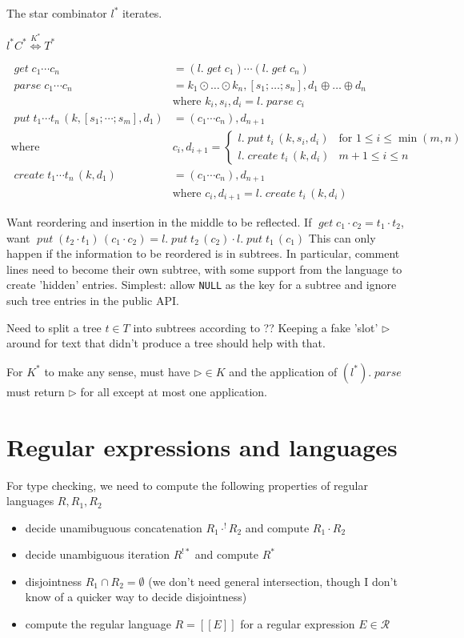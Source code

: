 \documentclass[12pt,fleqn]{amsart}
\newcommand{\ensmath}[1]{\ensuremath{#1}\xspace}
\newcommand{\opnam}[1]{\ensmath{\operatorname{\mathit{#1}}}}
\newcommand{\nparse}{\opnam{parse}}
\newcommand{\lget}[1]{\opnam{get}{#1}}
\newcommand{\lparse}[1]{\nparse{#1}}
\newcommand{\lput}[2]{\opnam{put}{#1}\,{(#2)}}
\newcommand{\lcreate}[2]{\opnam{create}{#1}\,{(#2)}}
\newcommand{\lenstype}[3][K]{\ensmath{{#2}\stackrel{#1}{\Longleftrightarrow}{#3}}}
\newcommand{\Regexp}{\ensmath{\mathcal R}}
\newcommand{\reglang}[1]{\ensmath{[\![{#1}]\!]}}
\newcommand{\conc}[2]{\ensmath{#1\cdot #2}}
\newcommand{\uaconc}[2]{\ensmath{#1\cdot^{!} #2}}
\newcommand{\cstar}[1]{\ensmath{#1^*}}
\newcommand{\uastar}[1]{\ensmath{#1^{!*}}}
\newcommand{\key}[1]{\ensmath{\kappa(#1)}}
\begin{document}
The star combinator $\cstar{l}$ iterates.

\infrule{l\in\lenstype{C}{T} \andalso \uastar{C} \andalso \uastar{\key{T}}}
        {\cstar{l}\in\lenstype[\cstar{K}]{\cstar{C}}{\cstar{T}}}

\begin{align*}
  \lget{c_1\cdots c_n} &= (l.\lget{c_1}) \cdots (l.\lget{c_n})\\
  \lparse{c_1\cdots c_n} &= k_1\odot\ldots\odot k_n, [s_1;\ldots;s_n],
                            d_1\oplus\ldots\oplus d_n\\
                            & \text{where } k_i,s_i,d_i = l.\lparse{c_i}\\
  \lput{t_1\cdots t_n}{k, [s_1;\cdots;s_m], d_1} &= (c_1 \cdots c_n), d_{n+1}\\
  \text{where } &c_i, d_{i+1} =
    \begin{cases}
      l.\lput{t_i}{k, s_i, d_i} & \text{for } 1 \leq i \leq \min(m,n)\\
      l.\lcreate{t_i}{k, d_i} & m+1 \leq i \leq n
    \end{cases}\\
  \lcreate{t_1 \cdots t_n}{k, d_1} &= (c_1\cdots c_n), d_{n+1}\\
  & \text{where } c_i, d_{i+1} = l.\lcreate{t_i}{k, d_i}
\end{align*}

Want reordering and insertion in the middle to be reflected. If
$\lget{\conc{c_1}{c_2}} = \conc{t_1}{t_2}$, want
$\lput{(\conc{t_2}{t_1})}{\conc{c_1}{c_2}} =
\conc{l.\lput{t_2}{c_2}}{l.\lput{t_1}{c_1}}$ This can only happen if the
information to be reordered is in subtrees. In particular, comment lines
need to become their own subtree, with some support from the language to
create 'hidden' entries. Simplest: allow {\tt NULL} as the key for a
subtree and ignore such tree entries in the public API.

Need to split a tree $t\in T$ into subtrees according to ?? Keeping a fake
'slot' $\rhd$ around for text that didn't produce a tree should help with
that.

For $K^*$ to make any sense, must have $\rhd\in K$ and the application of
$(l^*).\nparse$ must return $\rhd$ for all except at most one application.

\section{Regular expressions and languages}

For type checking, we need to compute the following properties of regular
languages $R, R_1, R_2$
\begin{itemize}
\item decide unamibuguous concatenation $\uaconc{R_1}{R_2}$ and compute
  $\conc{R_1}{R_2}$
\item decide unambiguous iteration $\uastar{R}$ and compute $R^*$
\item disjointness $R_1 \cap R_2 = \emptyset$ (we don't need general
  intersection, though I don't know of a quicker way to decide
  disjointness)
\item compute the regular language $R = \reglang{E}$ for a regular
  expression $E\in\Regexp$
\end{itemize}
\end{document}
